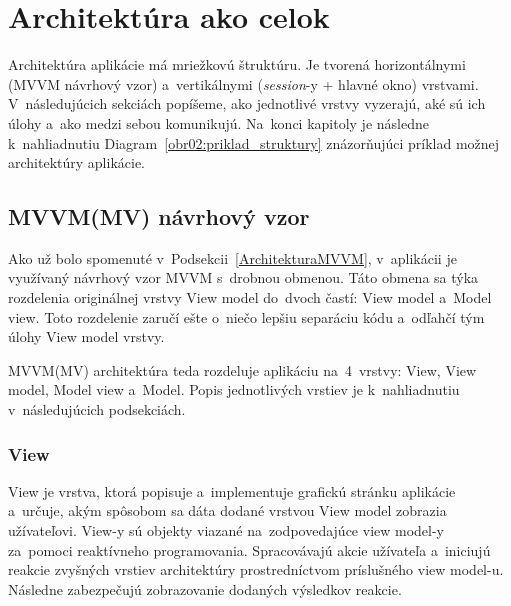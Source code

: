 \chapter{Architektúra ako celok}

Architektúra aplikácie má mriežkovú štruktúru. Je tvorená horizontálnymi (MVVM návrhový vzor) a~vertikálnymi (\textit{session}-y + hlavné okno) vrstvami. V~následujúcich sekciách popíšeme, ako jednotlivé vrstvy vyzerajú, aké sú ich úlohy a~ako medzi sebou komunikujú. Na~konci kapitoly je následne k~nahliadnutiu Diagram~\ref{obr02:priklad_struktury} znázorňujúci príklad možnej architektúry aplikácie.   

\section{MVVM(MV) návrhový vzor}\label{MVVMNavrhovyVzor}

Ako už bolo spomenuté v~Podsekcii~\ref{ArchitekturaMVVM}, v~aplikácii je využívaný návrhový vzor MVVM s~drobnou obmenou. Táto obmena sa týka rozdelenia originálnej vrstvy View model do~dvoch častí: View model a~Model view. Toto rozdelenie zaručí ešte o~niečo lepšiu separáciu kódu a~odľahčí tým úlohy View model vrstvy. 

MVVM(MV) architektúra teda rozdeluje aplikáciu na~4~vrstvy: View, View model, Model view a~Model. Popis jednotlivých vrstiev je k~nahliadnutiu v~následujúcich podsekciách. 

\subsection{View}

View je vrstva, ktorá popisuje a~implementuje grafickú stránku aplikácie a~určuje, akým spôsobom sa dáta dodané vrstvou View model zobrazia užívateľovi. View-y sú objekty viazané na~zodpovedajúce view model-y za~pomoci reaktívneho programovania. Spracovávajú akcie užívateľa a~iniciujú reakcie zvyšných vrstiev architektúry prostredníctvom príslušného view model-u. Následne zabezpečujú zobrazovanie dodaných výsledkov reakcie.

